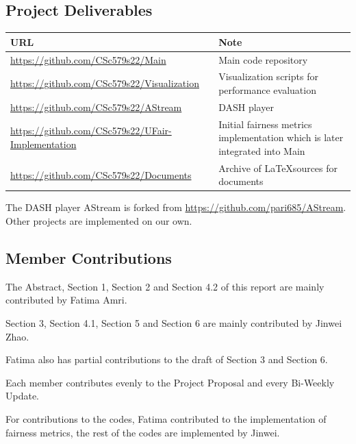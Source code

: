 \documentclass[12pt]{article}
\begin{document}
\subsection{Project Deliverables}
\begin{center}
\begin{tabular}{ | m{20em} | m{18em} | } 
\hline
URL                                               & Note                                                                       \\ 
\hline
\url{https://github.com/CSc579s22/Main}                 & Main code repository                                                       \\ 
\hline
\url{https://github.com/CSc579s22/Visualization}        & Visualization scripts for performance evaluation                           \\ 
\hline
\url{https://github.com/CSc579s22/AStream}             & DASH player                                                                \\ 
\hline
\url{https://github.com/CSc579s22/UFair-Implementation} & Initial fairness metrics implementation which is later integrated into Main  \\ 
\hline
\url{https://github.com/CSc579s22/Documents}           & Archive of \LaTeX sources for documents                                                \\
\hline
\end{tabular}
\end{center}

The DASH player AStream is forked from \url{https://github.com/pari685/AStream}. Other projects are implemented on our own.


\subsection{Member Contributions}
The Abstract, Section 1, Section 2 and Section 4.2 of this report are mainly contributed by Fatima Amri. 

Section 3, Section 4.1, Section 5 and Section 6 are mainly contributed by Jinwei Zhao. 

Fatima also has partial contributions to the draft of Section 3 and Section 6. 

Each member contributes evenly to the Project Proposal and every Bi-Weekly Update.

For contributions to the codes, Fatima contributed to the implementation of fairness metrics, the rest of the codes are implemented by Jinwei.
\end{document}
